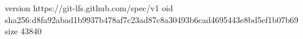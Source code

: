 version https://git-lfs.github.com/spec/v1
oid sha256:d8fa92abad1b9937b478af7c23ad87c8a30493b6cad4695443e8bd5ef1b07b69
size 43840
